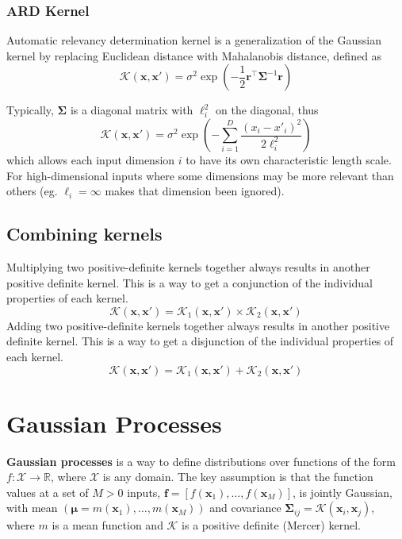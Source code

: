\documentclass[11pt]{article}
\begin{document}
\subsubsection*{ARD Kernel}
Automatic relevancy determination kernel is a generalization of the Gaussian kernel by replacing Euclidean distance with Mahalanobis distance, defined as
\[
\mathcal{K}(\boldsymbol{x}, \boldsymbol{x}') = \sigma^2 \exp \left( -\frac{1}{2} \boldsymbol{r}^\top \boldsymbol{\Sigma}^{-1} \boldsymbol{r} \right)
\]

Typically, $\boldsymbol{\Sigma}$ is a diagonal matrix with $\ell_i^2$ on the diagonal, thus
\[
\mathcal{K}(\boldsymbol{x}, \boldsymbol{x}') = \sigma^2 \exp \left( - \sum_{i=1}^D \frac{(x_i - x'_i)^2}{2 \ell_i^2} \right)
\]
which allows each input dimension $i$ to have its own characteristic length scale. For high-dimensional inputs where some dimensions may be more relevant than others (eg. $\ell_i = \infty$ makes that dimension been ignored).

\subsection{Combining kernels}
Multiplying two positive-definite kernels together always results in another positive definite kernel. 
This is a way to get a conjunction of the individual properties of each kernel.
\[
\mathcal{K}(\boldsymbol{x}, \boldsymbol{x}') = 
\mathcal{K}_1(\boldsymbol{x}, \boldsymbol{x}') \times \mathcal{K}_2(\boldsymbol{x}, \boldsymbol{x}')
\]
Adding two positive-definite kernels together always results in another positive definite kernel. 
This is a way to get a disjunction of the individual properties of each kernel.
\[
\mathcal{K}(\boldsymbol{x}, \boldsymbol{x}') = 
\mathcal{K}_1(\boldsymbol{x}, \boldsymbol{x}') + \mathcal{K}_2(\boldsymbol{x}, \boldsymbol{x}')
\]
\clearpage
\section{Gaussian Processes}
\textbf{Gaussian processes} is a way to define distributions over functions of the form $f: \mathcal{X} \to \mathbb{R}$, where $\mathcal{X}$ is any domain. 
The key assumption is that the function values at a set of $M > 0$ inputs, $\boldsymbol{f} = [f(\boldsymbol{x}_1), \ldots, f(\boldsymbol{x}_M)]$, is jointly Gaussian, with mean $(\boldsymbol{\mu} = m(\boldsymbol{x}_1), \ldots, m(\boldsymbol{x}_M))$ and covariance $\boldsymbol{\Sigma}_{ij} = \mathcal{K}(\boldsymbol{x}_i, \boldsymbol{x}_j)$, where $m$ is a mean function and $\mathcal{K}$ is a positive definite (Mercer) kernel. 
\end{document}
